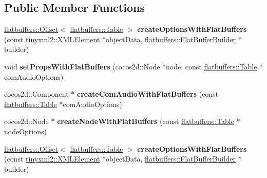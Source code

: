 \subsection*{Public Member Functions}
\begin{DoxyCompactItemize}
\item 
\mbox{\label{classcocostudio_1_1ComAudioReader_a33091106b8de177b8dd86d14c9f94da9}} 
\hyperlink{structflatbuffers_1_1Offset}{flatbuffers\+::\+Offset}$<$ \hyperlink{classflatbuffers_1_1Table}{flatbuffers\+::\+Table} $>$ {\bfseries create\+Options\+With\+Flat\+Buffers} (const \hyperlink{classtinyxml2_1_1XMLElement}{tinyxml2\+::\+X\+M\+L\+Element} $\ast$object\+Data, \hyperlink{classflatbuffers_1_1FlatBufferBuilder}{flatbuffers\+::\+Flat\+Buffer\+Builder} $\ast$builder)
\item 
\mbox{\label{classcocostudio_1_1ComAudioReader_a65b1aa581374eaa7fe5e62b7d99c2651}} 
void {\bfseries set\+Props\+With\+Flat\+Buffers} (cocos2d\+::\+Node $\ast$node, const \hyperlink{classflatbuffers_1_1Table}{flatbuffers\+::\+Table} $\ast$com\+Audio\+Options)
\item 
\mbox{\label{classcocostudio_1_1ComAudioReader_abc9ab9a2618ccb6279bb313eb5667007}} 
cocos2d\+::\+Component $\ast$ {\bfseries create\+Com\+Audio\+With\+Flat\+Buffers} (const \hyperlink{classflatbuffers_1_1Table}{flatbuffers\+::\+Table} $\ast$com\+Audio\+Options)
\item 
\mbox{\label{classcocostudio_1_1ComAudioReader_aed694a2f0d5a99911b9519211e31b7ea}} 
cocos2d\+::\+Node $\ast$ {\bfseries create\+Node\+With\+Flat\+Buffers} (const \hyperlink{classflatbuffers_1_1Table}{flatbuffers\+::\+Table} $\ast$node\+Options)
\item 
\mbox{\label{classcocostudio_1_1ComAudioReader_ac53f6f9f8701e1c84f76940db30c0e4e}} 
\hyperlink{structflatbuffers_1_1Offset}{flatbuffers\+::\+Offset}$<$ \hyperlink{classflatbuffers_1_1Table}{flatbuffers\+::\+Table} $>$ {\bfseries create\+Options\+With\+Flat\+Buffers} (const \hyperlink{classtinyxml2_1_1XMLElement}{tinyxml2\+::\+X\+M\+L\+Element} $\ast$object\+Data, \hyperlink{classflatbuffers_1_1FlatBufferBuilder}{flatbuffers\+::\+Flat\+Buffer\+Builder} $\ast$builder)

\end{DoxyCompactItemize}

